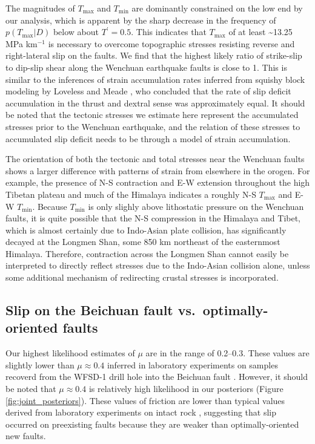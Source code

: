 \documentclass[twocolumn,jgrga]{AGUTeX}
\begin{document}
\begin{article}
{The magnitudes of $T_{\mathrm{max}}$ and $T_{\mathrm{min}}$ are
dominantly constrained on the low end by our analysis, which is apparent
by the sharp decrease in the frequency of $p(T_{\mathrm{max}}|D)$ below
about $T^\prime = 0.5$. This indicates that $T_{\mathrm{max}}$ of at
least \textasciitilde{}13.25 MPa km$^{-1}$ is necessary to overcome
topographic stresses resisting reverse and right-lateral slip on the
faults. We find that the highest likely ratio of strike-slip to dip-slip
shear along the Wenchuan earthquake faults is close to 1. This is
similar to the inferences of strain accumulation rates inferred from
squishy block modeling by Loveless and Meade \citet{loveless2011}, who
concluded that the rate of slip deficit accumulation in the thrust and
dextral sense was approximately equal. It should be noted that the
tectonic stresses we estimate here represent the accumulated stresses
prior to the Wenchuan earthquake, and the relation of these stresses to
accumulated slip deficit needs to be through a model of strain
accumulation.

The orientation of both the tectonic and total stresses near the
Wenchuan faults shows a larger difference with patterns of strain from
elsewhere in the orogen. For example, the presence of N-S contraction
and E-W extension throughout the high Tibetan plateau and much of the
Himalaya \citep[e.g.,][]{armijo1986, molnar1988, taylor2003} indicates a
roughly N-S $T_{\mathrm{max}}$ and E-W $T_{\mathrm{min}}$. Because
$T_{\mathrm{min}}$ is only slighly above lithostatic pressure on the
Wenchuan faults, it is quite possible that the N-S compression in the
Himalaya and Tibet, which is almost certainly due to Indo-Asian plate
collision, has significantly decayed at the Longmen Shan, some 850
km northeast of the easternmost Himalaya. Therefore, contraction across
the Longmen Shan cannot easily be interpreted to directly reflect
stresses due to the Indo-Asian collision alone, unless some additional
mechanism of redirecting crustal stresses is incorporated.

\subsection{Slip on the Beichuan fault vs.~optimally-oriented
faults}\label{slip-on-the-beichuan-fault-vs.optimally-oriented-faults}

Our highest likelihood estimates of $\mu$ are in the range of 0.2--0.3.
These values are slightly lower than $\mu \approx 0.4$ inferred in
laboratory experiments on samples recoverd from the WFSD-1 drill hole
into the Beichuan fault \citep{kuo2014}. However, it should be noted that
$\mu \approx 0.4$ is relatively high likelihood in our posteriors
(Figure \ref{fig:joint_posteriors}). These values of friction 
are lower than typical values derived from laboratory experiments on
intact rock \citep[e.g.,][]{byerlee1978}, suggesting that slip occurred on
preexisting faults because they are weaker than optimally-oriented new
faults.

}
\end{article}
\end{document}
